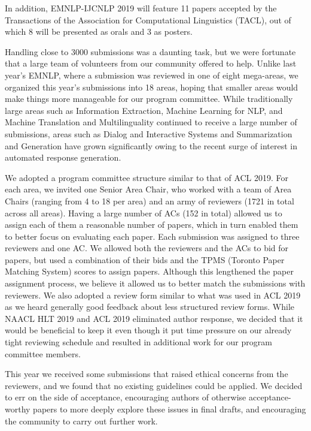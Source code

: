 In addition, EMNLP-IJCNLP 2019 will feature 11 papers accepted by the Transactions of the Association for Computational Linguistics (TACL), out of which 8 will be presented as orals and 3 as posters.		
 
Handling close to 3000 submissions was a daunting task, but we were fortunate that a large team of volunteers from our community offered to help. Unlike last year’s EMNLP, where a submission was reviewed in one of eight mega-areas, we organized this year’s submissions into 18 areas, hoping that smaller areas would make things more manageable for our program committee. While traditionally large areas such as Information Extraction, Machine Learning for NLP, and Machine Translation and Multilinguality continued to receive a large number of submissions, areas such as Dialog and Interactive Systems and Summarization and Generation have grown significantly owing to the recent surge of interest in automated response generation.

We adopted a program committee structure similar to that of ACL 2019. For each area, we invited one Senior Area Chair, who worked with a team of Area Chairs (ranging from 4 to 18 per area) and an army of reviewers (1721 in total across all areas). Having a large number of ACs (152 in total) allowed us to assign each of them a reasonable number of papers, which in turn enabled them to better focus on evaluating each paper. Each submission was assigned to three reviewers and one AC. We allowed both the reviewers and the ACs to bid for papers, but used a combination of their bids and the TPMS (Toronto Paper Matching System) scores to assign papers. Although this lengthened the paper assignment process, we believe it allowed us to better match the submissions with reviewers. We also adopted a review form similar to what was used in ACL 2019 as we heard generally good feedback about less structured review forms. While NAACL HLT 2019 and ACL 2019 eliminated author response, we decided that it would be beneficial to keep it even though it put time pressure on our already tight reviewing schedule and resulted in additional work for our program committee members.

This year we received some submissions that raised ethical concerns from the reviewers, and we found that no existing guidelines could be applied. We decided to err on the side of acceptance, encouraging authors of otherwise acceptance-worthy papers to more deeply explore these issues in final drafts, and encouraging the community to carry out further work.

